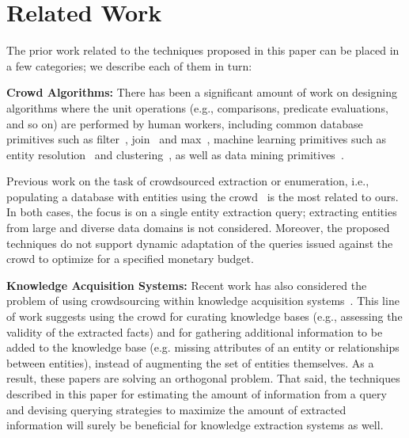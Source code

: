 

\section{Related Work}
\label{sec:related}
The prior work related to the techniques proposed in this paper can be placed in a few categories; we describe each of them in turn:

\vspace{5pt}\noindent\textbf{Crowd Algorithms:} There has been a significant amount of work on designing algorithms where the unit operations (e.g., comparisons, predicate evaluations, and so on) are performed by human workers, including common database primitives such as filter~\cite{crowdscreen}, join~\cite{markus-sorts-joins} and max~\cite{so-who-won},  machine learning primitives such as entity resolution~\cite{entity-matching, crowder} and clustering~\cite{crowdclustering}, as well as data mining primitives~\cite{amsterdamer:2013, get-another-label}. 

Previous work on the task of crowdsourced extraction or enumeration, i.e., populating a database with entities using the crowd~\cite{park:2014, trushkowsky:2013} is the most related to ours. In both cases, the focus is on a single entity extraction query; extracting entities from large and diverse data domains is not considered. Moreover, the proposed techniques do not support  dynamic adaptation of the queries issued against the crowd to optimize for a specified monetary budget. 

\vspace{5pt}\noindent\textbf{Knowledge Acquisition Systems:} Recent work has also considered the problem of using crowdsourcing within knowledge acquisition systems~\cite{jiang:13, kondredi:2014, west:2014}. This line of work suggests using the crowd for curating knowledge bases (e.g., assessing the validity of the extracted facts) and for gathering additional information to be added to the knowledge base (e.g. missing attributes of an entity or relationships between entities), instead of augmenting the set of entities themselves. As a result, these papers are solving an orthogonal problem. That said, the techniques described in this paper for estimating the amount of information from a query and devising querying strategies to maximize the amount of extracted information will surely be beneficial for knowledge extraction systems as well.

